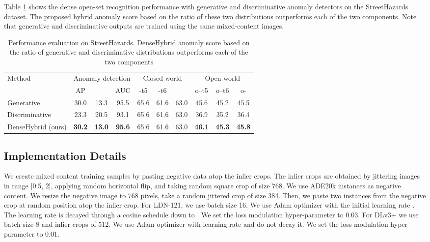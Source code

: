 \documentclass[runningheads]{llncs}
\begin{document}
Table \ref{table:osr_more} shows the dense open-set recognition performance with generative and discriminative anomaly detectors on the StreetHazards dataset.
The proposed hybrid anomaly score based on the ratio of these two distributions outperforms each of the two components.
Note that generative and discriminative outputs are trained using the same mixed-content images.
\begin{table}[h]
\begin{center}
\caption{Performance evaluation on StreetHazards.
DenseHybrid anomaly score based on the ratio of generative and discriminative distributions outperforms each of the two components}
\label{table:osr_more}
\begin{tabular}{lccccccccc}
\hline \hline
\multirow{2}{*}{Method} & \multicolumn{3}{c|}{Anomaly detection} & \multicolumn{3}{c|}{Closed world} & \multicolumn{3}{c}{Open world}\\
  &  AP         &        & \multicolumn{1}{c|}{AUC}    &  -t5& \multicolumn{1}{c}{-t6} & \multicolumn{1}{c|}{} &  o--t5 & o--t6 & o-\\ \hline \hline
Generative &  30.0  & 13.3 & 95.5  & 65.6  &  61.6  & 63.0 & 45.6 & 45.2 & 45.5 \\
Discriminative &  23.3  & 20.5 & 93.1  & 65.6  &  61.6  & 63.0 & 36.9 & 35.2 & 36.4 \\
DenseHybrid (ours) &  \textbf{30.2}  & \textbf{13.0} & \textbf{95.6}  & 65.6  &  61.6  & 63.0 & \textbf{46.1} & \textbf{45.3} & \textbf{45.8} \\\hline
\end{tabular}
\end{center}
\end{table}


\subsection{Implementation Details}

We create mixed content training samples by pasting negative data atop the inlier crops.
The inlier crops are obtained by jittering images in range [0.5, 2], applying random horizontal flip, and taking random square crop of size 768.
We use ADE20k instances as negative content.
We resize the negative image to 768 pixels, take a random jittered crop of size 384.
Then, we paste two instances from the negative crop at random position atop the inlier crop.
For LDN-121, we use batch size 16.
We use Adam optimizer with the initial learning rate .
The learning rate is decayed through a cosine schedule down to .
We set the loss modulation hyper-parameter  to 0.03.
For DLv3+ we use batch size 8 and inlier crops of 512.
We use Adam optimizer with learning rate  and do not decay it.
We set the loss modulation hyper-parameter  to 0.01.
\end{document}
